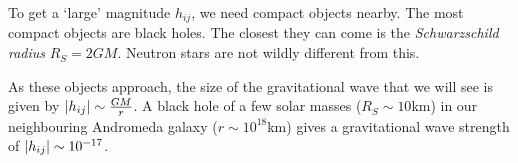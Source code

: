 \begin{example}
  To get a `large' magnitude $h_{ij}$, we need compact objects nearby.
  The most compact objects are black holes. The closest they can come is the \emph{Schwarzschild radius} $R_S = 2 G M$. Neutron stars are not wildly different from this.

  As these objects approach, the size of the gravitational wave that we will see is given by $\abs{h_{ij}} \sim \frac{GM}{r}$.
  A black hole of a few solar masses ($R_S \sim 10$km) in our neighbouring Andromeda galaxy ($r \sim 10^{18}$km) gives a gravitational wave strength of $\abs{h_{ij}} \sim 10^{-17}$.
\end{example}
